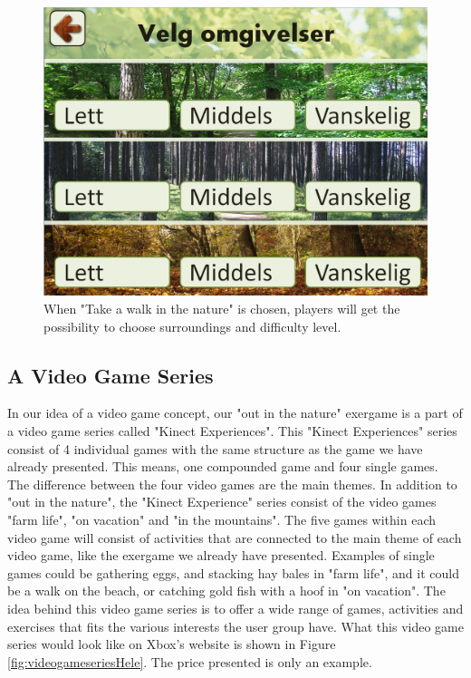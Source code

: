 \begin{figure} [H]
\centering
\includegraphics[scale=0.45]{VelgOmgivelser.jpg}
\caption[Choice of surroundings and difficulty]{When "Take a walk in the nature" is chosen, players will get the possibility to choose surroundings and difficulty level.}
\label{fig:omgivelseNivaa}
\end{figure}



\subsection{A Video Game Series}
In our idea of a video game concept, our "out in the nature" exergame is a part of a video game series called "Kinect Experiences". This "Kinect Experiences" series consist of 4 individual games with the same structure as the game we have already presented. This means, one compounded game and four single games. The difference between the four video games are the main themes. In addition to "out in the nature", the "Kinect Experience" series consist of the video games "farm life", "on vacation" and "in the mountains". The five games within each video game will consist of activities that are connected to the main theme of each video game, like the exergame we already have presented. Examples of single games could be gathering eggs, and stacking hay bales in "farm life", and it could be a walk on the beach, or catching gold fish with a hoof in "on vacation". The idea behind this video game series is to offer a wide range of games, activities and exercises that fits the various interests the user group have. What this video game series would look like on Xbox's website is shown in Figure \ref{fig:videogameseriesHele}. The price presented is only an example. 



